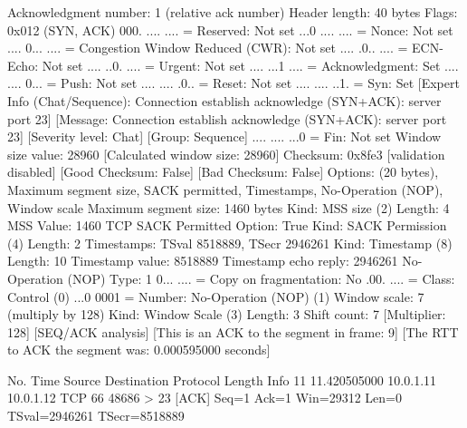     Acknowledgment number: 1    (relative ack number)
    Header length: 40 bytes
    Flags: 0x012 (SYN, ACK)
        000. .... .... = Reserved: Not set
        ...0 .... .... = Nonce: Not set
        .... 0... .... = Congestion Window Reduced (CWR): Not set
        .... .0.. .... = ECN-Echo: Not set
        .... ..0. .... = Urgent: Not set
        .... ...1 .... = Acknowledgment: Set
        .... .... 0... = Push: Not set
        .... .... .0.. = Reset: Not set
        .... .... ..1. = Syn: Set
            [Expert Info (Chat/Sequence): Connection establish acknowledge (SYN+ACK): server port 23]
                [Message: Connection establish acknowledge (SYN+ACK): server port 23]
                [Severity level: Chat]
                [Group: Sequence]
        .... .... ...0 = Fin: Not set
    Window size value: 28960
    [Calculated window size: 28960]
    Checksum: 0x8fe3 [validation disabled]
        [Good Checksum: False]
        [Bad Checksum: False]
    Options: (20 bytes), Maximum segment size, SACK permitted, Timestamps, No-Operation (NOP), Window scale
        Maximum segment size: 1460 bytes
            Kind: MSS size (2)
            Length: 4
            MSS Value: 1460
        TCP SACK Permitted Option: True
            Kind: SACK Permission (4)
            Length: 2
        Timestamps: TSval 8518889, TSecr 2946261
            Kind: Timestamp (8)
            Length: 10
            Timestamp value: 8518889
            Timestamp echo reply: 2946261
        No-Operation (NOP)
            Type: 1
                0... .... = Copy on fragmentation: No
                .00. .... = Class: Control (0)
                ...0 0001 = Number: No-Operation (NOP) (1)
        Window scale: 7 (multiply by 128)
            Kind: Window Scale (3)
            Length: 3
            Shift count: 7
            [Multiplier: 128]
    [SEQ/ACK analysis]
        [This is an ACK to the segment in frame: 9]
        [The RTT to ACK the segment was: 0.000595000 seconds]

No.     Time           Source                Destination           Protocol Length Info
     11 11.420505000   10.0.1.11             10.0.1.12             TCP      66     48686 > 23 [ACK] Seq=1 Ack=1 Win=29312 Len=0 TSval=2946261 TSecr=8518889

